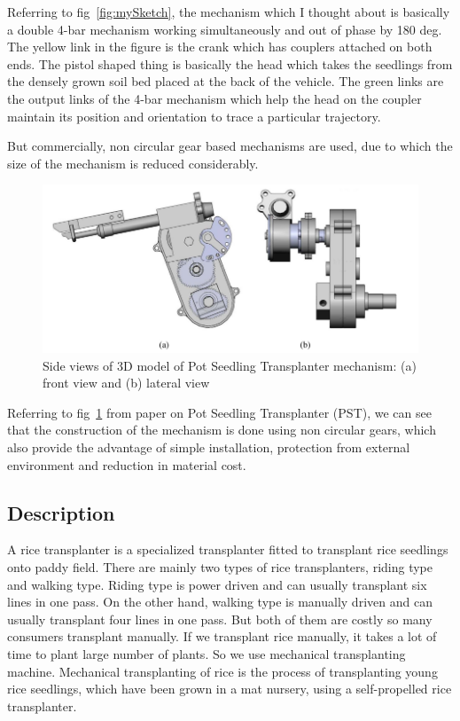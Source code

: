 \documentclass[a4paper,latin,center,onecolumn]{paper}
\begin{document}
            Referring to fig~\ref{fig:mySketch}, the mechanism which I thought about is basically a double 4-bar mechanism working simultaneously and out of phase by 180 deg. The yellow link in the figure is the crank which has couplers attached on both ends. The pistol shaped thing is basically the head which takes the seedlings from the densely grown soil bed placed at the back of the vehicle. The green links are the output links of the 4-bar mechanism which help the head on the coupler maintain its position and orientation to trace a particular trajectory. \par
            But commercially, non circular gear based mechanisms are used, due to which the size of the mechanism is reduced considerably. 
            \begin{figure}[hbt!]
                \centering
                \includegraphics[width=0.9\columnwidth]{Images/side_view_pot_seedling_transplanter.png}
                \caption{Side views of 3D model of Pot Seedling Transplanter mechanism: (a) front view and (b) lateral view}
                \label{fig:refSketch}
            \end{figure}

            Referring to fig~\ref{fig:refSketch} from paper \cite{camPST} on Pot Seedling Transplanter (PST), we can see that the construction of the mechanism is done using non circular gears, which also provide the advantage of simple installation, protection from external environment and reduction in material cost.
        
        \subsection{Description}
            A rice transplanter is a specialized transplanter fitted to transplant rice seedlings onto paddy field. There are mainly two types of rice transplanters, riding type and walking type. Riding type is power driven and can usually transplant six lines in one pass. On the other hand, walking type is manually driven and can usually transplant four lines in one pass. But both of them are costly so many consumers transplant manually. If we transplant rice manually, it takes a lot of time to plant large number of plants. So we use mechanical transplanting machine. Mechanical transplanting of rice is the process of transplanting young rice seedlings, which have been grown in a mat nursery, using a self-propelled rice transplanter. \par
            
\end{document}
